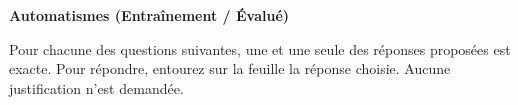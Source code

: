 \documentclass[oneside,12pt]{exam}          %
\begin{document}

\footer{}{\footnotesize \etablissement}{}

\hrulefill\raisebox{-1.9pt}{\quad\decofourleft~\decosix~\decofourright \quad}\hrulefill
\begin{center}
	\textbf{\large Automatismes (Entraînement / Évalué)}
\end{center}




Pour chacune des questions suivantes, une et une seule des réponses proposées est exacte. Pour répondre, entourez sur la feuille la réponse choisie. Aucune justification n'est demandée.
\end{document}
